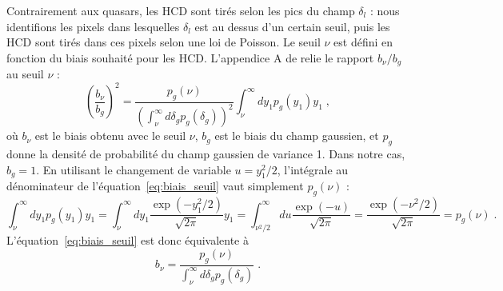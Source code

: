 Contrairement aux quasars, les HCD sont tirés selon les pics du champ $\delta_l$ : nous identifions les pixels dans lesquelles $\delta_l$ est au dessus d'un certain seuil, puis les HCD sont tirés dans ces pixels selon une loi de Poisson.
Le seuil $\nu$ est défini en fonction du biais souhaité pour les HCD.
L'appendice A de \textcite{Font-Ribera2012a} relie le rapport $b_{\nu} / b_g$ au seuil $\nu$ :
\begin{equation}
  \label{eq:biais_seuil}
  \left(\frac{b_{\nu}}{b_g}\right)^2 = \frac{p_g(\nu)}{\left( \int_{\nu}^{\infty} d\delta_g p_g(\delta_g) \right)^2} \int_{\nu}^{\infty} dy_1 p_g(y_1) y_1 \; ,
\end{equation}
où $b_{\nu}$ est le biais obtenu avec le seuil $\nu$, $b_g$ est le biais du champ gaussien, et $p_g$ donne la densité de probabilité du champ gaussien de variance 1. Dans notre cas, $b_g = 1$.
En utilisant le changement de variable $u = y_1^2 / 2$, l'intégrale au dénominateur de l'équation~\ref{eq:biais_seuil} vaut simplement $p_g(\nu)$ :
\begin{equation}
  \label{eq:biais_seuil2}
  \int_{\nu}^\infty dy_1 p_g(y_1)y_1 = 
\int_{\nu}^\infty dy_1 \frac{\exp(-y_1^2/2)}{\sqrt{2\pi}}  y_1 = \int_{\nu^2/2}^\infty du \frac{\exp(-u)}{\sqrt{2\pi}}=\frac{\exp(-\nu^2/2)}{\sqrt{2\pi}}=p_g(\nu) \; .
\end{equation}
L'équation~\ref{eq:biais_seuil} est donc équivalente à
\begin{equation}
 b_{\nu} = \frac{p_g(\nu)}{\int_{\nu}^{\infty} d\delta_g p_g(\delta_g)} \; .
\end{equation}
